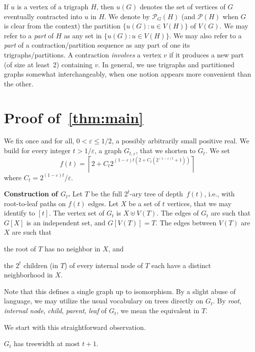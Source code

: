 \documentclass[a4paper,UKenglish,cleveref,hyperref,autoref]{lipics-v2021}
\renewcommand{\P}{{\mathcal P}}
\begin{document}
If $u$ is a vertex of a trigraph $H$, then $u(G)$ denotes the set of vertices of $G$ eventually contracted into $u$ in $H$.
We denote by $\P_G(H)$ (and $\P(H)$ when $G$ is clear from the context) the partition $\{u(G) : u \in V(H)\}$ of $V(G)$.
We may refer to a \emph{part} of $H$ as any set in $\{u(G) : u \in V(H)\}$.
We may also refer to a \emph{part} of a contraction/partition sequence as any part of one its trigraphs/partitions.
A contraction \emph{involves} a vertex $v$ if it produces a new part (of size at least~2) containing $v$.
In general, we use trigraphs and partitioned graphs somewhat interchangeably, when one notion appears more convenient than the other. 

\section{Proof of~\cref{thm:main}}

We fix once and for all, $0 < \varepsilon \leqslant 1/2$, a possibly arbitrarily small positive real.
We build for every integer $t > 1/\varepsilon$, a graph $G_{t,\varepsilon}$, that we shorten to $G_t$.
We set $$f(t)=\left\lceil 2+C_t 2^{(1-\varepsilon)t(2+C_t (2^{(1-\varepsilon)t}+1))}\right\rceil$$ where $C_t = 2^{(1-\varepsilon)t}/\varepsilon$.

\medskip
 
 \textbf{Construction of $G_t$.}
 Let $T$ be the full $2^t$-ary tree of depth~$f(t)$, i.e., with root-to-leaf paths on $f(t)$ edges.
 Let $X$ be a set of $t$ vertices, that we may identify to $[t]$.
 The vertex set of $G_t$ is $X \uplus V(T)$.
 The edges of $G_t$ are such that $G[X]$ is an independent set, and $G[V(T)]=T$.
 The edges between $V(T)$ are $X$ are such that
 \begin{compactitem}
 \item the root of $T$ has no neighbor in $X$, and
 \item the $2^t$ children (in $T$) of every internal node of $T$ each have a distinct neighborhood in $X$. 
 \end{compactitem}
 Note that this defines a single graph up to isomorphism.
 By a slight abuse of language, we may utilize the usual vocabulary on trees directly on $G_t$.
 By \emph{root}, \emph{internal node}, \emph{child}, \emph{parent}, \emph{leaf} of $G_t$, we mean the equivalent in $T$.

 \medskip

 We start with this straightforward observation.
\begin{lemma}\label{lem:tw-ub}
 $G_t$ has treewidth at most $t+1$.
\end{lemma}
\end{document}
